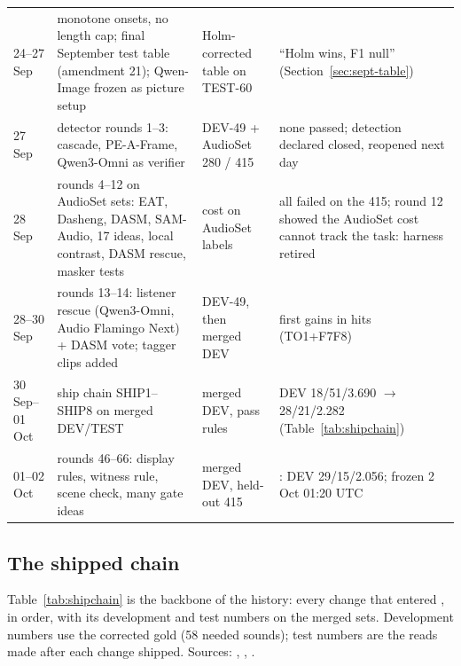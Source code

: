 \begin{longtable}{L{1.7cm}L{4.2cm}L{3.6cm}L{5.2cm}}
24--27 Sep & monotone onsets, no length cap; final September test table (amendment 21); Qwen-Image frozen as picture setup & Holm-corrected table on TEST-60 & ``Holm wins, F1 null'' (Section~\ref{sec:sept-table}) \\
27 Sep & detector rounds 1--3: cascade, PE-A-Frame, Qwen3-Omni as verifier & DEV-49 + AudioSet 280 / 415 & none passed; detection declared closed, reopened next day \\
28 Sep & rounds 4--12 on AudioSet sets: EAT, Dasheng, DASM, SAM-Audio, 17 ideas, local contrast, DASM rescue, masker tests & cost on AudioSet labels & all failed on the 415; round 12 showed the AudioSet cost cannot track the task: harness retired \\
28--30 Sep & rounds 13--14: listener rescue (Qwen3-Omni, Audio Flamingo Next) + DASM vote; tagger clips added & DEV-49, then merged DEV & first gains in hits (TO1+F7F8) \\
30 Sep--01 Oct & ship chain SHIP1--SHIP8 on merged DEV/TEST & merged DEV, pass rules & DEV 18/51/3.690 $\to$ 28/21/2.282 (Table~\ref{tab:shipchain}) \\
01--02 Oct & rounds 46--66: display rules, witness rule, scene check, many gate ideas & merged DEV, held-out 415 & \Dp{}: DEV 29/15/2.056; frozen 2 Oct 01:20 UTC \\
\end{longtable}

\subsection{The shipped chain}\label{sec:shipchain}
Table~\ref{tab:shipchain} is the backbone of the history: every change that entered \Dp{}, in order, with its
development and test numbers on the merged sets. Development numbers use the corrected gold (58 needed sounds);
test numbers are the reads made after each change shipped. Sources: ,
, .

